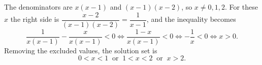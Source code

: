 The denominators are $x(x-1)$ and $(x-1)(x-2)$, so $x\ne0,1,2$. For these $x$ the right side is $\dfrac{x-2}{(x-1)(x-2)}=\dfrac1{x-1}$, and the inequality becomes
\[\dfrac1{x(x-1)}-\dfrac{x}{x(x-1)}<0\iff\dfrac{1-x}{x(x-1)}<0\iff-\dfrac1x<0\iff x>0.\]
Removing the excluded values, the solution set is
\[\boxed{0<x<1\ \text{ or }\ 1<x<2\ \text{ or }\ x>2}.\]
